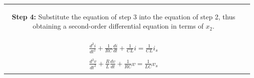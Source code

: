 \documentclass[aspectratio=169]{beamer}
\begin{document}
\begin{frame}[fragile]
\begin{tabular}{cc}
\begin{columns}
\begin{column}{1\textwidth}
\small		\textbf{Step 4:} Substitute the equation of step 3 into the equation of step 2, thus obtaining a second-order differential
equation in terms of $x_2$.
		\end{column}
		\end{columns}\\
	\begin{columns}
	\begin{column}{.5\textwidth}  %
\center		$\frac{L}{R}\frac{di}{dt}+i+CL\frac{d^2i}{dt^2}=i_s$\\
		$\frac{d^2i}{dt^2}+\frac{1}{RC}\frac{di}{dt}+\frac{1}{CL}i=\frac{1}{CL}i_s$\\
		
				\end{column}
	\begin{column}{.5\textwidth}  %
\center		$LC\frac{d^2v}{dt^2}+v+RC\frac{dv}{dt}=v_s$\\
		$\frac{d^2v}{dt^2}+\frac{R}{L}\frac{dv}{dt}+\frac{1}{RC}v=\frac{1}{LC}v_s$\\
				\end{column}				
	\end{columns}\\		
	
	\end{tabular}		
\end{frame}
\end{document}
